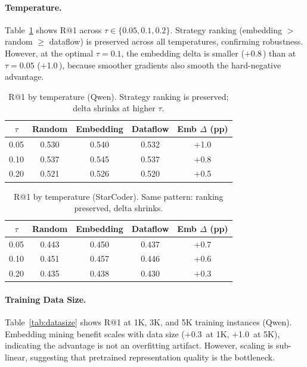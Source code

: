 \documentclass[11pt]{article}
\newcommand{\pp}{\,\text{pp}}
\begin{document}
\paragraph{Temperature.}
Table~\ref{tab:temp-qwen} shows R@1 across $\tau \in \{0.05, 0.1, 0.2\}$.
Strategy ranking (embedding $>$ random $\geq$ dataflow) is preserved across all temperatures, confirming robustness.
However, at the optimal $\tau = 0.1$, the embedding delta is smaller ($+$0.8\pp{}) than at $\tau = 0.05$ ($+$1.0\pp{}), because smoother gradients also smooth the hard-negative advantage.

\begin{table}[t]
\centering
\caption{R@1 by temperature (Qwen). Strategy ranking is preserved; delta shrinks at higher $\tau$.}
\label{tab:temp-qwen}
\begin{tabular}{ccccc}
\toprule
$\tau$ & Random & Embedding & Dataflow & Emb $\Delta$ (pp) \\
\midrule
0.05 & 0.530 & 0.540 & 0.532 & $+$1.0 \\
0.10 & 0.537 & 0.545 & 0.537 & $+$0.8 \\
0.20 & 0.521 & 0.526 & 0.520 & $+$0.5 \\
\bottomrule
\end{tabular}
\end{table}

\begin{table}[t]
\centering
\caption{R@1 by temperature (StarCoder). Same pattern: ranking preserved, delta shrinks.}
\label{tab:temp-starcoder}
\begin{tabular}{ccccc}
\toprule
$\tau$ & Random & Embedding & Dataflow & Emb $\Delta$ (pp) \\
\midrule
0.05 & 0.443 & 0.450 & 0.437 & $+$0.7 \\
0.10 & 0.451 & 0.457 & 0.446 & $+$0.6 \\
0.20 & 0.435 & 0.438 & 0.430 & $+$0.3 \\
\bottomrule
\end{tabular}
\end{table}

\paragraph{Training Data Size.}
Table~\ref{tab:datasize} shows R@1 at 1K, 3K, and 5K training instances (Qwen).
Embedding mining benefit scales with data size ($+$0.3\pp{} at 1K, $+$1.0\pp{} at 5K), indicating the advantage is not an overfitting artifact.
However, scaling is sub-linear, suggesting that pretrained representation quality is the bottleneck.
\end{document}
